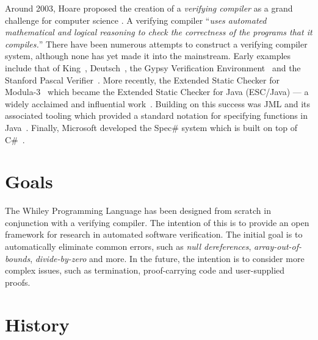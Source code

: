 Around 2003, Hoare proposed the creation of a {\em verifying compiler} as a grand challenge for computer science \cite{Hoare03}.  A verifying
compiler ``{\em uses automated mathematical and logical reasoning to
  check the correctness of the programs that it compiles.}''  There
have been numerous attempts to construct a verifying compiler system,
although none has yet made it into the mainstream.  Early examples
include that of King~\cite{King69}, Deutsch~\cite{Deutsch73}, the
Gypsy Verification Environment~\cite{Good85} and the Stanford Pascal
Verifier~\cite{LGHKMOPS95}.  More recently, the Extended Static
Checker for Modula-3~\cite{DLNS98} which became the Extended Static
Checker for Java (ESC/Java) --- a widely acclaimed and influential
work~\cite{FLLNSS02}.  Building on this success was JML and its
associated tooling which provided a standard notation for specifying
functions in Java~\cite{LCCRC05}.  Finally, Microsoft %
developed the Spec\# system which is built on top of
C\#~\cite{BLS04}.%

\section{Goals}

The Whiley Programming Language has been designed from scratch in
conjunction with a verifying compiler.  The intention of this is to
provide an open framework for research in automated software
verification.  The initial goal is to automatically eliminate common
errors, such as {\em null dereferences}, {\em array-out-of-bounds},
{\em divide-by-zero} and more.  In the future, the intention is to
consider more complex issues, such as termination, proof-carrying code and user-supplied proofs.

\section{History}